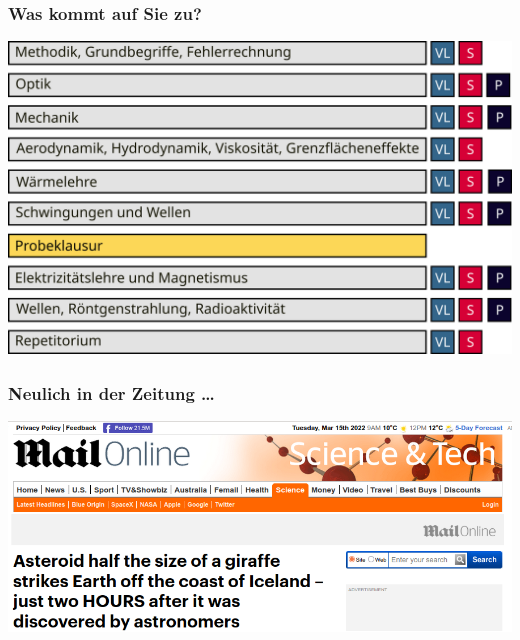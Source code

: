 \documentclass{beamer}
\begin{document}
\begin{frame}
\frametitle{Was kommt auf Sie zu?}

\begin{center}
    \includegraphics[width=\textwidth]{physik_module.png}
\end{center}

\end{frame}
 

\begin{frame}
\frametitle{Neulich in der Zeitung \dots}

\begin{center}
\includegraphics[width=\textwidth]{giraffe.png}
\end{center}

 
\end{frame}
\end{document}
